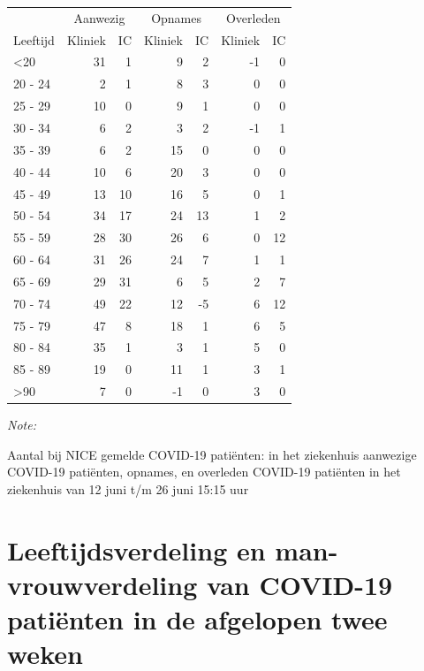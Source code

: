 \documentclass[
  english,
  man,floatsintext]{apa6}
\begin{document}
\begin{table}
\centering\begingroup\fontsize{10}{12}\selectfont

\begin{threeparttable}
\begin{tabular}{lrrrrrr}
\toprule
\multicolumn{1}{c}{ } & \multicolumn{2}{c}{Aanwezig} & \multicolumn{2}{c}{Opnames} & \multicolumn{2}{c}{Overleden} \\
\cmidrule(l{3pt}r{3pt}){2-3} \cmidrule(l{3pt}r{3pt}){4-5} \cmidrule(l{3pt}r{3pt}){6-7}
Leeftijd & Kliniek & IC & Kliniek & IC & Kliniek & IC\\
\midrule
<20 & 31 & 1 & 9 & 2 & -1 & 0\\
20 - 24 & 2 & 1 & 8 & 3 & 0 & 0\\
25 - 29 & 10 & 0 & 9 & 1 & 0 & 0\\
30 - 34 & 6 & 2 & 3 & 2 & -1 & 1\\
35 - 39 & 6 & 2 & 15 & 0 & 0 & 0\\
40 - 44 & 10 & 6 & 20 & 3 & 0 & 0\\
45 - 49 & 13 & 10 & 16 & 5 & 0 & 1\\
50 - 54 & 34 & 17 & 24 & 13 & 1 & 2\\
55 - 59 & 28 & 30 & 26 & 6 & 0 & 12\\
60 - 64 & 31 & 26 & 24 & 7 & 1 & 1\\
65 - 69 & 29 & 31 & 6 & 5 & 2 & 7\\
70 - 74 & 49 & 22 & 12 & -5 & 6 & 12\\
75 - 79 & 47 & 8 & 18 & 1 & 6 & 5\\
80 - 84 & 35 & 1 & 3 & 1 & 5 & 0\\
85 - 89 & 19 & 0 & 11 & 1 & 3 & 1\\
>90 & 7 & 0 & -1 & 0 & 3 & 0\\
\bottomrule
\end{tabular}
\begin{tablenotes}
\item \textit{Note: } 
\item Aantal bij NICE gemelde COVID-19 patiënten: in het ziekenhuis aanwezige COVID-19 patiënten, opnames, en overleden COVID-19 patiënten in het ziekenhuis van 12 juni t/m 26 juni 15:15 uur
\end{tablenotes}
\end{threeparttable}
\endgroup{}
\end{table}

\newpage

\hypertarget{leeftijdsverdeling-en-man-vrouwverdeling-van-covid-19-patiuxebnten-in-de-afgelopen-twee-weken}{%
\section{Leeftijdsverdeling en man-vrouwverdeling van COVID-19 patiënten in de afgelopen twee weken}\label{leeftijdsverdeling-en-man-vrouwverdeling-van-covid-19-patiuxebnten-in-de-afgelopen-twee-weken}}
\end{document}
